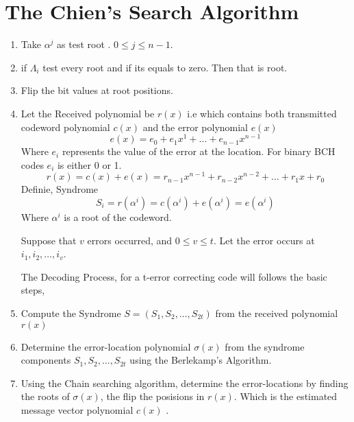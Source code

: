 \documentclass[journal,12pt,twocolumn]{IEEEtran}
\renewcommand\thesection{\arabic{section}}
\begin{document}
\section{The Chien's Search Algorithm}
\begin{enumerate}[label=\thesection.\arabic*
,ref=\thesection.\theenumi]
\item Take $\alpha ^j$ as test root . $0\leq j \leq n-1$.
\item if $\Lambda_i $ test every root and if its equals to zero. Then that is root.
\item  Flip the bit values at root positions.

\item Let the Received polynomial be $r(x)$ i.e which contains both transmitted codeword polynomial $c(x)$ and 
the 
error polynomial $e(x)$ \begin{equation}
e(x)=e_0+e_1x^1+...+e_{n-1}x^{n-1}
\end{equation} Where $e_i$ represents the value of the error at the location. For binary BCH codes  $e_i$ is 
either 0 or 1.
\begin{equation}
r(x)=c(x)+e(x)=r_{n-1}x^{n-1}+r_{n-2}x^{n-2}+\dots+r_1x+r_0
\end{equation}
Definie, Syndrome \begin{equation}
S_i=r(\alpha^i)=c(\alpha^i)+e(\alpha^i)=e(\alpha^i)
\end{equation} Where $\alpha^i $ is a root of the codeword.

Suppose that $v$ errors occurred, and $0\leq v \leq t$.
Let the error occurs at $i_1,i_2,\dots,i_v$. 




The Decoding Process, for a t-error correcting code will follows the basic steps,
\item Compute the Syndrome $S=(S_1,S_2,\dots,S_{2t})$ from the received polynomial $r(x)$
\item Determine the error-location polynomial $\sigma(x)$ from the syndrome components $S_1,S_2,\dots,S_{2t}$ 
using the Berlekamp's Algorithm.
\item Using the Chain searching algorithm, determine the error-locations by finding the roots of $\sigma(x)$, 
the flip the posisions in $r(x)$. Which is the estimated message vector polynomial $\hat{c}(x)$ .


\end{enumerate}
\end{document}
